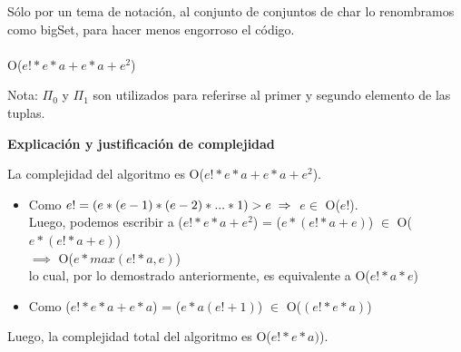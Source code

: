 \documentclass[11pt]{article}
\begin{document}
Sólo por un tema de notación, al conjunto de conjuntos de char lo renombramos como bigSet, para hacer menos 
engorroso el código.
\\ \\
\noindent\makebox[\linewidth]{\rule{17cm}{0.4pt}}
 {O($e!*e*a + e*a + e^2$)}

\vspace{1mm}
Nota: $\Pi_0$ y $\Pi_1$ son utilizados para referirse al primer y segundo elemento de las tuplas.

\vspace{3mm}
\begin{center}
\textbf{Explicación y justificación de complejidad} \\ 
\end{center} 

La complejidad del algoritmo es O($e!*e*a + e*a + e^{2}$).
\begin{itemize}
\item Como $e! = (e*(e-1)*(e-2)*...*1) > e \\ \implies $ $e \in$ O($e!$). \\ Luego, podemos escribir a 
  ($e!*e*a + e^2$) = ($e *(e!*a + e)$) $\in$ O($e *(e!*a + e)$) \\ $\implies$ O($e*max(e!*a, e)$) \\ lo cual, por lo demostrado anteriormente, es equivalente a O($e!*a*e$)
\item Como ($e!*e*a + e*a$) = ($e*a (e! + 1)$) $\in$ O($(e!*e*a)$)
\end{itemize}
Luego, la complejidad total del algoritmo es O($e!*e*a)$).
\end{document}
